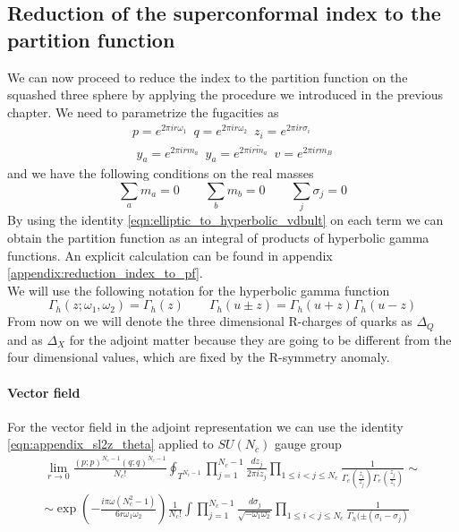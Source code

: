 \subsection{Reduction of the superconformal index to the partition function}
We can now proceed to reduce the index to the partition function on the squashed three sphere by applying the procedure we introduced in the previous chapter. 
We need to parametrize the fugacities as
\begin{gather}
p = e^{ 2 \pi i r  \omega_1 } \, \, \,  q = e^{ 2 \pi i r \omega_2 } \,  \, \, z_i = e^{ 2 \pi i r \sigma_i } \\
\, \, y_a = e^{ 2 \pi i r m_a } \, \,  \,
y_a = e^{ 2 \pi i r  {\tilde m_a} } \, \, \,  v = e^{ 2 \pi i r m_B}
\label{eqn:fugacities_redefined_el}
\end{gather}
and we have the following conditions on the real masses
\begin{equation}
\sum_a m_a =0 \qquad \sum_b m_b = 0 \qquad \sum_j \sigma_j = 0
\end{equation}
By using the identity \eqref{eqn:elliptic_to_hyperbolic_vdbult} on each term we can obtain the partition function as an integral of products of hyperbolic gamma functions.
An explicit calculation can be found in appendix \ref{appendix:reduction_index_to_pf}.\\
We will use the following notation for the hyperbolic gamma function
\begin{equation}
\Gamma_h (z ; \omega_1 , \omega_2) = \Gamma_h(z) \qquad \Gamma_h ( u \pm z) = \Gamma_h( u + z) \Gamma_h( u - z)
\end{equation}
From now on we will denote the three dimensional R-charges of quarks as $\Delta_Q$ and as $\Delta_X$ for the adjoint matter because they are going to be different from the four dimensional values, which are fixed by the R-symmetry anomaly.

\paragraph{Vector field}

For the vector field in the adjoint representation we can use the identity \eqref{eqn:appendix_sl2z_theta} applied to $SU(N_c)$ gauge group
\begin{multline}
\lim_{r \rightarrow 0} \frac{ (p;p)^{N_c- 1}(q;q)^{N_c- 1} }{ N_c ! }
\oint_{T^{N_c -1}} \prod_{j=1}^{N_c -1 } \frac{ d z_j}{2 \pi i z_j} \prod_{1 \leq i<j \leq N_c } \frac{1}{\Gamma_e( \frac{z_i}{z_j} )\Gamma_e( \frac{z_j}{z_i} )} \sim
\\
\sim 
\exp \left(  
- \frac{ i \pi \omega (N_c^2 -1)}{6 r \omega_1 \omega_2}
\right)
 \frac{1}{N_c !} \int \prod_{j=1}^{N_c -1 } \frac{d \sigma_j}{\sqrt{- \omega_1 \omega_2} } \prod_{1 \leq i<j \leq N_c }\frac{1}{\Gamma_h( \pm (\sigma_i - \sigma_j) }
\end{multline}

